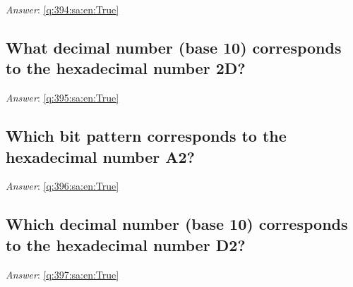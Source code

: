 \documentclass[a4paper,11pt,oneside]{article}
\begin{document}
\begin{sloppypar}
\vspace{2cm}

\noindent\makebox[\textwidth]{\hrulefill}

\vspace{1cm}

\textit{Answer}: \autoref{q:394:sa:en:True}



\subsection{What decimal number (base 10) corresponds to the hexadecimal number 2D?}

\label{q:395:sa:en:False}

\vspace{2cm}

\noindent\makebox[\textwidth]{\hrulefill}

\vspace{1cm}

\textit{Answer}: \autoref{q:395:sa:en:True}



\subsection{Which bit pattern corresponds to the hexadecimal number A2?}

\label{q:396:sa:en:False}

\vspace{2cm}

\noindent\makebox[\textwidth]{\hrulefill}

\vspace{1cm}

\textit{Answer}: \autoref{q:396:sa:en:True}



\subsection{Which decimal number (base 10) corresponds to the hexadecimal number D2?}

\label{q:397:sa:en:False}

\vspace{2cm}

\noindent\makebox[\textwidth]{\hrulefill}

\vspace{1cm}

\textit{Answer}: \autoref{q:397:sa:en:True}




\end{sloppypar}
\end{document}
